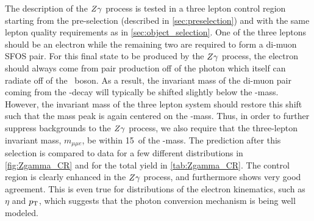 The description of the $Z\gamma$ process is tested in a three lepton control
region starting from the 
pre-selection (described in \sec\ref{sec:preselection}) and with the same
lepton quality requirements as in \sec\ref{sec:object_selection}.
One of the three leptons should be an electron while the remaining two 
are required to form a di-muon SFOS pair. For this final state to be produced
by the $Z\gamma$ process, the electron should always come from 
pair production off of the photon which itself can radiate
off of the \z~boson.  As a result, the invariant mass
of the di-muon pair coming from the \z-decay will typically be shifted
slightly below the \z-mass. However, the invariant mass of the three lepton 
system should restore this shift such that the mass peak is again centered 
on the \z-mass. Thus, in order to further suppress backgrounds to the 
$Z\gamma$ process, we also require that the three-lepton invariant
mass, $m_{\mu\mu e}$, be within 15~\GeV of the \z-mass.
The prediction after this selection is compared to data for a few different
distributions in \fig\ref{fig:Zgamma_CR} and for the total yield
in \tab\ref{tab:Zgamma_CR}. The control region is clearly enhanced
in the $Z\gamma$ process, and furthermore shows very good agreement. 
This is even true for distributions of the electron kinematics, 
such as $\eta$ and $p_{\mathrm{T}}$, which suggests that the photon conversion
mechanism is being well modeled.

